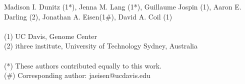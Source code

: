 \begin{sloppypar}
Madison I. Dunitz (1*), Jenna M. Lang (1*), Guillaume Jospin (1), Aaron E. Darling (2), Jonathan A. Eisen(1#), David A. Coil (1) \\
\\
(1) UC Davis, Genome Center \\
(2) ithree institute, University of Technology Sydney, Australia\\
\\
(*) These authors contributed equally to this work. \\ 
(#) Corresponding author: jaeisen@ucdavis.edu
\end{sloppypar}
